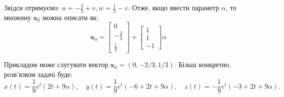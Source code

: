 \documentclass{hw_template}
\begin{document}
Звідси отримуємо: $u=-\frac{2}{3}+v, w=\frac{1}{3}-v$. Отже, якщо 
ввести параметр $\alpha$, то множину $\mathbf{x}_0$ можна описати як:
\begin{equation*}
    \mathbf{x}_0 = \begin{bmatrix}
        0 \\
        -\frac{2}{3} \\
        \frac{1}{3}
    \end{bmatrix} + \begin{bmatrix}
        1 \\
        1 \\
        -1
    \end{bmatrix}\alpha
\end{equation*}

Прикладом може слугувати вектор $\mathbf{x}_0 = (0,-2/3,1/3)$. Більш конкретно, 
розв'язком задачі буде:
\begin{equation*}
    x(t)=\frac{1}{9}e^t(2t+9\alpha), \quad y(t) = \frac{1}{9}e^t(-6+2t+9\alpha), \quad 
    z(t) = -\frac{1}{9}e^t(-3+2t+9\alpha).
\end{equation*}
\end{document}
